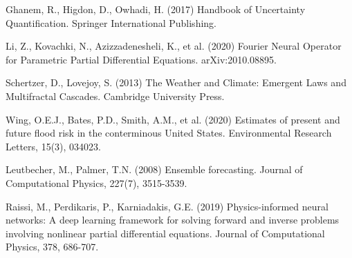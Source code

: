 \documentclass{article}
\begin{document}
\begin{thebibliography}{99}
 Ghanem, R., Higdon, D., Owhadi, H. (2017) Handbook of Uncertainty Quantification. Springer International Publishing.

 Li, Z., Kovachki, N., Azizzadenesheli, K., et al. (2020) Fourier Neural Operator for Parametric Partial Differential Equations. arXiv:2010.08895.

 Schertzer, D., Lovejoy, S. (2013) The Weather and Climate: Emergent Laws and Multifractal Cascades. Cambridge University Press.

 Wing, O.E.J., Bates, P.D., Smith, A.M., et al. (2020) Estimates of present and future flood risk in the conterminous United States. Environmental Research Letters, 15(3), 034023.

 Leutbecher, M., Palmer, T.N. (2008) Ensemble forecasting. Journal of Computational Physics, 227(7), 3515-3539.

 Raissi, M., Perdikaris, P., Karniadakis, G.E. (2019) Physics-informed neural networks: A deep learning framework for solving forward and inverse problems involving nonlinear partial differential equations. Journal of Computational Physics, 378, 686-707.
\end{thebibliography}
\end{document}
